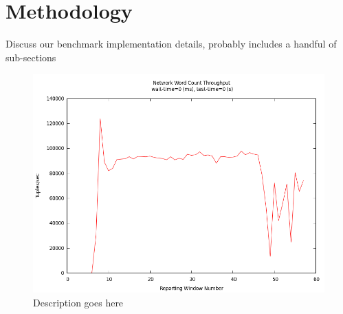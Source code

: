 \section{Methodology}
Discuss our benchmark implementation details, probably includes a handful of sub-sections

\begin{figure}[t]
\centering
\includegraphics[width=.8\linewidth]{figures/tput.png}
\caption{Description goes here}
\label{fig:label-me-if-you-want}
\end{figure}
